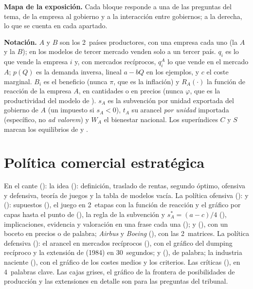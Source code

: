 \documentclass[11pt]{article}
\begin{document}
\begin{anotaciones}
\textbf{Mapa de la exposición.} Cada bloque responde a una de las preguntas del tema, de la empresa al gobierno y a la interacción entre gobiernos; a la derecha, lo que se cuenta en cada apartado.
\begin{infografiacaja}
\caption{Mapa del tema: la pregunta de cada bloque, sus apartados y el hilo que los une}\label{figu:mapa-tema}
\end{infografiacaja}
\end{anotaciones}


\begin{anotaciones}
\textbf{Notación.} $A$ y $B$ son los 2~países productores, con una empresa cada uno (la $A$ y la $B$); en los modelos de tercer mercado venden solo a un tercer país. $q_i$ es lo que vende la empresa $i$ y, con mercados recíprocos, $q_i^A$ lo que vende en el mercado $A$; $p(Q)$ es la demanda inversa, lineal $a-bQ$ en los ejemplos, y $c$ el coste marginal. $B_i$ es el beneficio (nunca $\pi$, que es la inflación) y $R_A(\cdot)$ la función de reacción de la empresa $A$, en cantidades o en precios (nunca $\varphi$, que es la productividad del modelo de ). $s_A$ es la subvención por unidad exportada del gobierno de $A$ (un impuesto si $s_A<0$), $t_A$ su arancel \emph{por unidad} importada (específico, no \emph{ad valorem}) y $W_A$ el bienestar nacional. Los superíndices $C$ y $S$ marcan los equilibrios de  y .
\end{anotaciones}

\section{Política comercial estratégica}\label{sec:pce}

\begin{notaopositor}
En el cante (): la idea (): definición, traslado de rentas, segundo óptimo, ofensiva y defensiva, teoría de juegos y la tabla de modelos vacía. La política ofensiva ():  y  (): supuestos (), el juego en 2~etapas con la función de reacción y el gráfico por capas hasta el punto de  (), la regla de la subvención y $s_A^*=(a-c)/4$ (), implicaciones, evidencia y valoración en una frase cada una ();  y  (), con un boceto en precios o de palabra; \emph{Airbus} y \emph{Boeing} (), con las 2~matrices. La política defensiva (): el arancel en mercados recíprocos (), con el gráfico del dumping recíproco y la extensión de  (1984) en 30~segundos;  y  (), de palabra; la industria naciente (), con el gráfico de los costes medios y los criterios. Las críticas (), en 4~palabras clave. Las cajas grises, el gráfico de la frontera de posibilidades de producción y las extensiones en detalle son para las preguntas del tribunal.
\end{notaopositor}
\end{document}
